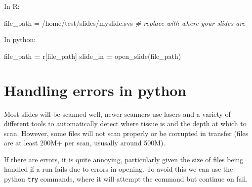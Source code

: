 \documentclass[
]{book}
\newenvironment{Shaded}{\begin{snugshade}}{\end{snugshade}}
\newcommand{\CommentTok}[1]{\textcolor[rgb]{0.56,0.35,0.01}{\textit{#1}}}
\newcommand{\NormalTok}[1]{#1}
\newcommand{\OperatorTok}[1]{\textcolor[rgb]{0.81,0.36,0.00}{\textbf{#1}}}
\newcommand{\OtherTok}[1]{\textcolor[rgb]{0.56,0.35,0.01}{#1}}
\newcommand{\StringTok}[1]{\textcolor[rgb]{0.31,0.60,0.02}{#1}}
\begin{document}
In R:

\begin{Shaded}
\begin{Highlighting}[]
\NormalTok{file\_path }\OtherTok{=} \StringTok{\textquotesingle{}/home/test/slides/myslide.svs\textquotesingle{}} \CommentTok{\# replace with where your slides are}
\end{Highlighting}
\end{Shaded}

In python:

\begin{Shaded}
\begin{Highlighting}[]
\NormalTok{file\_path }\OperatorTok{=}\NormalTok{ r[}\StringTok{\textquotesingle{}file\_path\textquotesingle{}}\NormalTok{]}
\NormalTok{slide\_in }\OperatorTok{=}\NormalTok{ open\_slide(file\_path)}
\end{Highlighting}
\end{Shaded}

\hypertarget{handling-errors-in-python}{%
\section{Handling errors in python}\label{handling-errors-in-python}}

Most slides will be scanned well, newer scanners use lasers and a variety of different tools to automatically detect where tissue is and the depth at which to scan. However, some files will not scan properly or be corrupted in transfer (files are at least 200M+ per scan, ususally around 500M).

If there are errors, it is quite annoying, particularly given the size of files being handled if a run fails due to errors in opening. To avoid this we can use the python \texttt{try} commands, where it will attempt the command but continue on fail.
\end{document}
